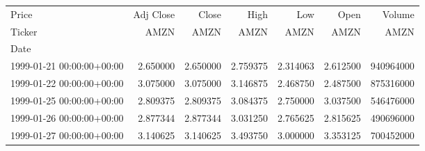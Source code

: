 \begin{tabular}{lrrrrrr}
\toprule
Price & Adj Close & Close & High & Low & Open & Volume \\
Ticker & AMZN & AMZN & AMZN & AMZN & AMZN & AMZN \\
Date &  &  &  &  &  &  \\
\midrule
1999-01-21 00:00:00+00:00 & 2.650000 & 2.650000 & 2.759375 & 2.314063 & 2.612500 & 940964000 \\
1999-01-22 00:00:00+00:00 & 3.075000 & 3.075000 & 3.146875 & 2.468750 & 2.487500 & 875316000 \\
1999-01-25 00:00:00+00:00 & 2.809375 & 2.809375 & 3.084375 & 2.750000 & 3.037500 & 546476000 \\
1999-01-26 00:00:00+00:00 & 2.877344 & 2.877344 & 3.031250 & 2.765625 & 2.815625 & 490696000 \\
1999-01-27 00:00:00+00:00 & 3.140625 & 3.140625 & 3.493750 & 3.000000 & 3.353125 & 700452000 \\
\bottomrule
\end{tabular}
